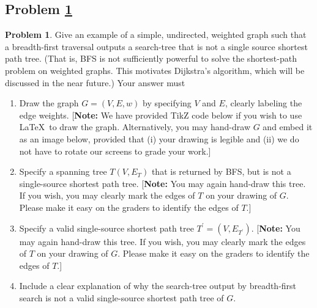 \documentclass[11pt]{article}
\theoremstyle{definition}
\theoremstyle{definition}
\newtheorem{required}{Problem}
\theoremstyle{definition}
\begin{document}
\newpage
\subsection{Problem \ref{DFS4}}
\begin{required} \label{DFS4}
	Give an example of a simple, undirected, weighted graph such that a breadth-first traversal outputs a search-tree that is not a single source shortest path tree. (That is, BFS is not sufficiently powerful to solve the shortest-path problem on weighted graphs. This motivates Dijkstra's algorithm, which will be discussed in the near future.) 
	Your answer must
	\begin{enumerate}[label=(\alph*)]
		\item Draw the graph $G = (V,E, w)$ by specifying $V$ and $E$, clearly labeling the edge weights.  [\textbf{Note:} We have provided TikZ code below if you wish to use \LaTeX \ to draw the graph. Alternatively, you may hand-draw $G$ and embed it as an image below, provided that (i) your drawing is legible and (ii) we do not have to rotate our screens to grade your work.]
		\item Specify a spanning tree $T(V, E_{T})$ that is returned by BFS, but is not a single-source shortest path tree. [\textbf{Note:} You may again hand-draw this tree. If you wish, you may clearly mark the edges of $T$ on your drawing of $G$. Please make it easy on the graders to identify the edges of $T$.] 

		\item Specify a valid single-source shortest path tree $T^{\prime} = (V,E_{T^{\prime}})$.  [\textbf{Note:} You may again hand-draw this tree. If you wish, you may clearly mark the edges of $T$ on your drawing of $G$. Please make it easy on the graders to identify the edges of $T$.] 

		\item Include a clear explanation of why the search-tree output by breadth-first search is not a valid single-source shortest path tree of $G$.
	\end{enumerate}
\end{required}
\end{document}
